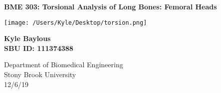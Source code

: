 \documentclass[12pt]{article}
\begin{document}
 

\begin{titlepage}
   \begin{center}
   
       \vspace*{1cm}
 
       \textbf{\Large{BME 303: Torsional Analysis of Long Bones: Femoral Heads}}
 
       \vspace{0.5cm}
       
       \begin{center}
   		\texttt{[image: /Users/Kyle/Desktop/torsion.png]}
	  \end{center} 	   
 
       \vspace{1.5cm}
 
       \textbf{\Large{Kyle Baylous}}\\
       \vspace{1.5cm}
       \textbf{\Large{SBU ID: 111374388}}
 
       \vfill

 
       \vspace{0.8cm}
 
 
       Department of Biomedical Engineering\\
       Stony Brook University\\
       12/6/19
 
   \end{center}
\end{titlepage}
\end{document}
